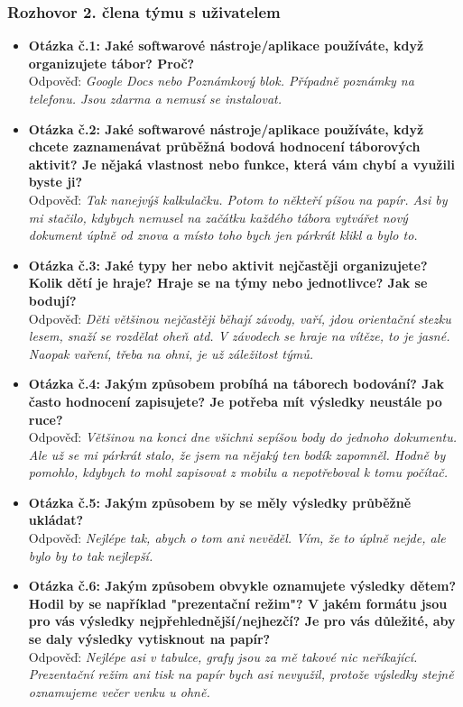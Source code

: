 \documentclass[a4paper, 12pt]{article} %
\begin{document}
\subsubsection{Rozhovor 2. člena týmu s uživatelem}
\begin{itemize}
    \item \textbf{Otázka č.1: Jaké softwarové nástroje/aplikace používáte, když organizujete 
    tábor? Proč?} \\
    Odpověď: \textit{Google Docs nebo Poznámkový blok. Případně poznámky na telefonu. 
    Jsou zdarma a nemusí se instalovat.}

    \item \textbf{Otázka č.2: Jaké softwarové nástroje/aplikace používáte, když chcete 
    zaznamenávat průběžná bodová hodnocení táborových aktivit? Je nějaká vlastnost nebo 
    funkce, která vám chybí a využili byste ji?} \\
    Odpověď: \textit{Tak nanejvýš kalkulačku. Potom to někteří píšou na papír. Asi by mi 
    stačilo, kdybych nemusel na začátku každého tábora vytvářet nový dokument úplně od znova 
    a místo toho bych jen párkrát klikl a bylo to.}

    \item \textbf{Otázka č.3: Jaké typy her nebo aktivit nejčastěji organizujete? Kolik dětí 
    je hraje? Hraje se na týmy nebo jednotlivce? Jak se bodují?} \\
    Odpověď: \textit{Děti většinou nejčastěji běhají závody, vaří, jdou orientační stezku 
    lesem, snaží se rozdělat oheň atd. V závodech se hraje na vítěze, to je jasné. Naopak 
    vaření, třeba na ohni, je už záležitost týmů.}

    \item \textbf{Otázka č.4: Jakým způsobem probíhá na táborech bodování? Jak často hodnocení 
    zapisujete? Je potřeba mít výsledky neustále po ruce?} \\
    Odpověď: \textit{Většinou na konci dne všichni sepíšou body do jednoho dokumentu. Ale už 
    se mi párkrát stalo, že jsem na nějaký ten bodík zapomněl. Hodně by pomohlo, kdybych to 
    mohl zapisovat z mobilu a nepotřeboval k tomu počítač.}

    \item \textbf{Otázka č.5: Jakým způsobem by se měly výsledky průběžně ukládat?} \\
    Odpověď: \textit{Nejlépe tak, abych o tom ani nevěděl. Vím, že to úplně nejde, ale bylo 
    by to tak nejlepší.}

    \item \textbf{Otázka č.6: Jakým způsobem obvykle oznamujete výsledky dětem? Hodil by se 
    například "prezentační režim"? V jakém formátu jsou pro vás výsledky 
    nejpřehlednější/nejhezčí? Je pro vás důležité, aby se daly výsledky vytisknout na papír?} \\
    Odpověď: \textit{Nejlépe asi v tabulce, grafy jsou za mě takové nic neříkající. 
    Prezentační režim ani tisk na papír bych asi nevyužil, protože výsledky stejně oznamujeme 
    večer venku u ohně.}


\end{itemize}
\end{document}
